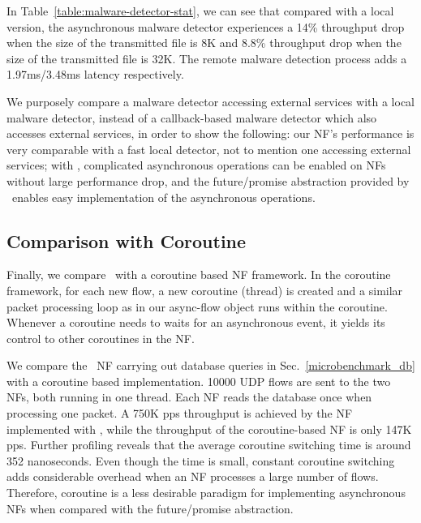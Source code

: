 In Table~\ref{table:malware-detector-stat}, %
 we can see that compared with a local version, the asynchronous malware detector experiences a 14\% throughput drop when the size of the transmitted file is 8K and 8.8\% throughput drop when the size of the transmitted file is 32K. The remote malware detection process adds a 1.97ms/3.48ms latency respectively. %

We purposely compare a malware detector accessing external services with a local malware detector, instead of a callback-based malware detector which also accesses external services, in order to show the following: our NF's performance is very comparable with a fast local detector, not to mention one accessing external services; with \netstar, complicated asynchronous operations can be enabled on NFs without large performance drop, and the future/promise abstraction provided by \netstar~enables easy implementation of the asynchronous operations.

\subsection{Comparison with Coroutine}
\label{sec:eval6}

Finally, we compare \netstar~with a coroutine based NF framework. %
In the coroutine framework, for each new flow, a new coroutine (thread) is created and a similar packet processing loop as in our async-flow object runs within the coroutine. Whenever a coroutine needs to waits for an asynchronous event, it yields its control to other coroutines in the NF. %

We compare the \netstar~NF carrying out database queries in Sec.~\ref{microbenchmark_db} with a coroutine based implementation. 10000 UDP flows are sent to the two NFs, both running in one thread. Each NF reads the database once when processing one packet. A 750K pps throughput is achieved by the NF implemented with \netstar, while the throughput of the coroutine-based NF is only 147K pps. Further profiling reveals that the average coroutine switching time is around 352 nanoseconds. Even though the time is small, constant coroutine switching adds considerable overhead when an NF processes a large number of flows. %
Therefore, coroutine is a less desirable paradigm for implementing asynchronous NFs when compared with the future/promise abstraction.
